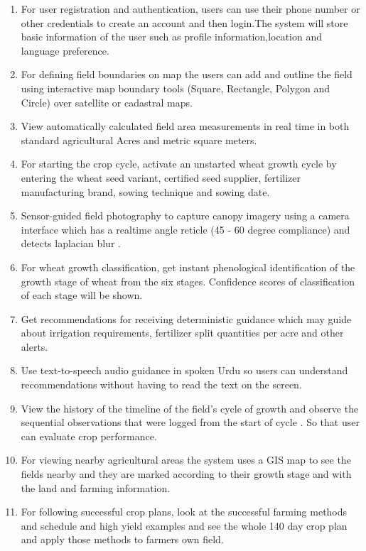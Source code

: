\documentclass{FastFyp}
\begin{document}
\begin{enumerate}
    \item For user registration and authentication, users can use their phone number or other credentials to create an account and then login.The system will store basic information of the user such as profile information,location and language preference.

    \item For defining field boundaries on map the users can add and outline the field using interactive map boundary tools (Square, Rectangle, Polygon and Circle) over satellite or cadastral maps.

    \item  View automatically calculated field area measurements in real time in both standard agricultural Acres and metric square meters.

    \item For starting the crop cycle, activate an unstarted wheat growth cycle by entering the wheat seed variant, certified seed supplier, fertilizer manufacturing brand, sowing technique and sowing date.

    \item Sensor-guided field photography to capture canopy imagery using a camera interface which has a  realtime angle reticle (45 - 60 degree compliance) and detects laplacian blur .

    \item For wheat growth classification, get instant phenological identification of the growth stage of wheat from the six stages. Confidence scores of classification of each stage will be shown.

    \item Get  recommendations for receiving deterministic guidance  which may guide about irrigation requirements, fertilizer split quantities per acre and other alerts.

    \item  Use text-to-speech audio guidance in spoken Urdu so users can understand recommendations without having to read the text on the screen.

    \item  View the history of the timeline of the field’s cycle of growth and observe the sequential observations that were logged from the start of cycle . So that user can evaluate crop performance.

    \item For viewing nearby agricultural areas the system uses a GIS map to see the fields nearby and they are marked according to their growth stage and with the land and farming information.

    \item For following successful crop plans, look at the successful farming methods and schedule and high yield examples and see the whole 140 day crop plan and apply those methods to farmers own field.
\end{enumerate}
\end{document}
